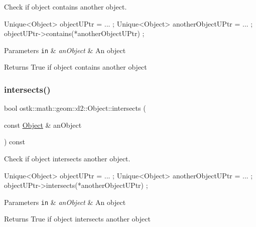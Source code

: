 Check if object contains another object. 


\begin{DoxyCode}
Unique<Object> objectUPtr = ... ;
Unique<Object> anotherObjectUPtr = ... ;
objectUPtr->contains(*anotherObjectUPtr) ;
\end{DoxyCode}



\begin{DoxyParams}[1]{Parameters}
\mbox{\tt in}  & {\em an\+Object} & An object \\
\hline
\end{DoxyParams}
\begin{DoxyReturn}{Returns}
True if object contains another object 
\end{DoxyReturn}
\mbox{\label{classostk_1_1math_1_1geom_1_1d2_1_1_object_a8791f58dd95e68a1eb4271aa15f7cd12}} 
\subsubsection{\texorpdfstring{intersects()}{intersects()}}
{\footnotesize\ttfamily bool ostk\+::math\+::geom\+::d2\+::\+Object\+::intersects (\begin{DoxyParamCaption}\item[{const \hyperlink{classostk_1_1math_1_1geom_1_1d2_1_1_object}{Object} \&}]{an\+Object }\end{DoxyParamCaption}) const\hspace{0.3cm}{\ttfamily [virtual]}}



Check if object intersects another object. 


\begin{DoxyCode}
Unique<Object> objectUPtr = ... ;
Unique<Object> anotherObjectUPtr = ... ;
objectUPtr->intersects(*anotherObjectUPtr) ;
\end{DoxyCode}



\begin{DoxyParams}[1]{Parameters}
\mbox{\tt in}  & {\em an\+Object} & An object \\
\hline
\end{DoxyParams}
\begin{DoxyReturn}{Returns}
True if object intersects another object 
\end{DoxyReturn}
\mbox{\label{classostk_1_1math_1_1geom_1_1d2_1_1_object_a456cc7121218d24c1322d0fe54230cc4}} 
